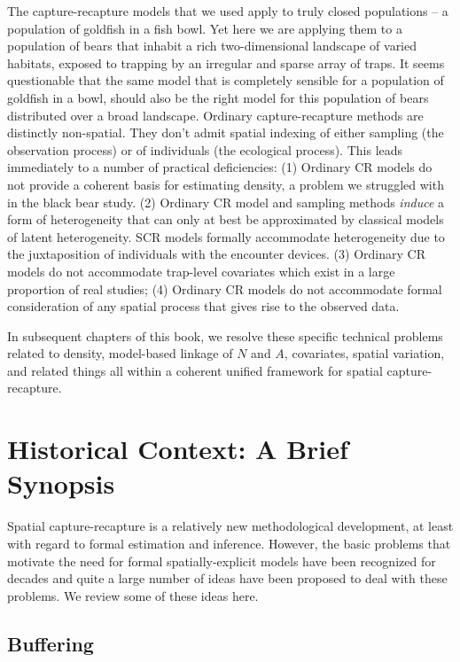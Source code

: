 The capture-recapture models that we used apply to truly closed
populations -- a population of goldfish in a fish bowl. Yet here we
are applying them to a population of bears that inhabit a rich
two-dimensional landscape of varied habitats, exposed to trapping by
an irregular and sparse array of traps. It seems questionable that the
same model that is completely sensible for a population of goldfish in
a bowl, should also be the right model for this population of bears
distributed over a broad landscape.  Ordinary capture-recapture
methods are distinctly non-spatial. They don't admit spatial indexing
of either sampling (the observation process) or of individuals (the
ecological process). This leads immediately to a number of practical
deficiencies: (1) Ordinary CR models do not provide a coherent basis
for estimating density, a problem we struggled with in the black bear
study.  (2) Ordinary CR model and sampling methods {\it induce} a form
of heterogeneity that can only at best be approximated by classical
models of latent heterogeneity. SCR models formally accommodate
heterogeneity due to the juxtaposition of individuals with the
encounter devices.  (3) Ordinary CR models do not accommodate
trap-level covariates which exist in a large proportion of real
studies; (4) Ordinary CR models do not accommodate formal
consideration of any spatial process that gives rise to the observed
data.

In subsequent chapters of this book, we resolve these specific
technical problems related to density, model-based linkage of $N$ and $A$,
covariates, spatial variation, and related things all within a
coherent unified framework for spatial capture-recapture.


\section{ Historical Context: A Brief Synopsis}

Spatial capture-recapture is a relatively new methodological
development, at least with regard to formal estimation and
inference. However, the basic problems that motivate the need for
formal spatially-explicit models have been recognized for decades and
quite a large number of ideas have been proposed to deal with these
problems. We review some of these ideas here.

\subsection{Buffering}

